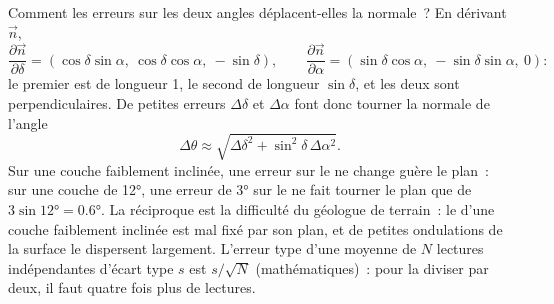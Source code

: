 Comment les erreurs sur les deux angles déplacent-elles la normale~? En dérivant $\vec n$,
\[
  \frac{\partial\vec n}{\partial\delta} = (\cos\delta\sin\alpha,\ \cos\delta\cos\alpha,\ -\sin\delta),
  \qquad
  \frac{\partial\vec n}{\partial\alpha} = (\sin\delta\cos\alpha,\ -\sin\delta\sin\alpha,\ 0):
\]
le premier est de longueur 1, le second de longueur $\sin\delta$, et les deux sont
perpendiculaires. De petites erreurs $\Delta\delta$ et $\Delta\alpha$ font donc
tourner la normale de l'angle
\[
  \Delta\theta \approx \sqrt{\Delta\delta^2 + \sin^2\delta\,\Delta\alpha^2}.
\]
Sur une couche faiblement inclinée, une erreur sur le  ne change
guère le plan~: sur une couche de  \ang{12}, une erreur de \ang{3} sur le
 ne fait tourner le plan que de $3\sin\ang{12} = \ang{0.6}$. La
réciproque est la difficulté du géologue de terrain~: le  d'une
couche faiblement inclinée est mal fixé par son plan, et de petites ondulations
de la surface le dispersent largement. L'erreur type d'une moyenne de $N$
lectures indépendantes d'écart type $s$ est $s/\sqrt N$ (mathématiques)~: pour la
diviser par deux, il faut quatre fois plus de lectures.

